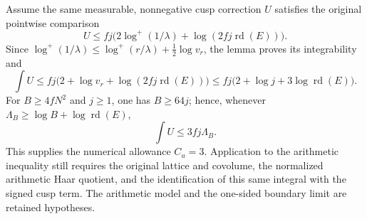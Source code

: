 Assume the same measurable, nonnegative cusp correction $U$ satisfies
the original pointwise comparison
\[
 U\le fj\bigl(2\log^+(1/\lambda)+\log(2fj\operatorname{rd}(E))\bigr).
\]
Since $\log^+(1/\lambda)\le\log^+(r/\lambda)+\tfrac12\log v_r$,
the lemma proves its integrability and
\[
 \int U\le fj\bigl(2+\log v_r+\log(2fj\operatorname{rd}(E))\bigr)
 \le fj\bigl(2+\log j+3\log\operatorname{rd}(E)\bigr).
\]
For $B\ge4fN^2$ and $j\ge1$, one has $B\ge64j$; hence, whenever
$\Lambda_B\ge\log B+\log\operatorname{rd}(E)$,
\[
                         \int U\le3fj\Lambda_B.
\]
This supplies the numerical allowance $C_u=3$. Application to the
arithmetic inequality still requires the original lattice and
covolume, the normalized arithmetic Haar quotient,
and the identification of this same integral with the signed cusp
term. The arithmetic model and the one-sided boundary limit are
retained hypotheses.
